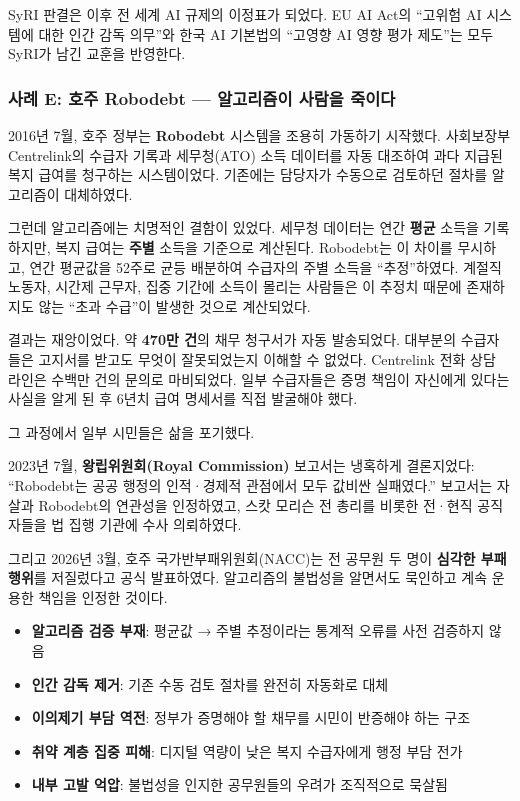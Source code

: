 SyRI 판결은 이후 전 세계 AI 규제의 이정표가 되었다. EU AI Act의 ``고위험 AI 시스템에 대한 인간 감독 의무''와 한국 AI 기본법의 ``고영향 AI 영향 평가 제도''는 모두 SyRI가 남긴 교훈을 반영한다.

\subsubsection*{사례 E: 호주 Robodebt --- 알고리즘이 사람을 죽이다}

2016년 7월, 호주 정부는 \textbf{Robodebt} 시스템을 조용히 가동하기 시작했다. 사회보장부 Centrelink의 수급자 기록과 세무청(ATO) 소득 데이터를 자동 대조하여 과다 지급된 복지 급여를 청구하는 시스템이었다. 기존에는 담당자가 수동으로 검토하던 절차를 알고리즘이 대체하였다.

그런데 알고리즘에는 치명적인 결함이 있었다. 세무청 데이터는 연간 \textbf{평균} 소득을 기록하지만, 복지 급여는 \textbf{주별} 소득을 기준으로 계산된다. Robodebt는 이 차이를 무시하고, 연간 평균값을 52주로 균등 배분하여 수급자의 주별 소득을 ``추정''하였다. 계절직 노동자, 시간제 근무자, 집중 기간에 소득이 몰리는 사람들은 이 추정치 때문에 존재하지도 않는 ``초과 수급''이 발생한 것으로 계산되었다.

결과는 재앙이었다. 약 \textbf{470만 건}의 채무 청구서가 자동 발송되었다. 대부분의 수급자들은 고지서를 받고도 무엇이 잘못되었는지 이해할 수 없었다. Centrelink 전화 상담 라인은 수백만 건의 문의로 마비되었다. 일부 수급자들은 증명 책임이 자신에게 있다는 사실을 알게 된 후 6년치 급여 명세서를 직접 발굴해야 했다.

그 과정에서 일부 시민들은 삶을 포기했다.

2023년 7월, \textbf{왕립위원회(Royal Commission)} 보고서는 냉혹하게 결론지었다: ``Robodebt는 공공 행정의 인적·경제적 관점에서 모두 값비싼 실패였다.'' 보고서는 자살과 Robodebt의 연관성을 인정하였고, 스캇 모리슨 전 총리를 비롯한 전·현직 공직자들을 법 집행 기관에 수사 의뢰하였다.\cite{south2024automated}

그리고 2026년 3월, 호주 국가반부패위원회(NACC)는 전 공무원 두 명이 \textbf{심각한 부패 행위}를 저질렀다고 공식 발표하였다. 알고리즘의 불법성을 알면서도 묵인하고 계속 운용한 책임을 인정한 것이다.

\begin{tcolorbox}[colback=red!5!white, colframe=red!60!black, title={\textbf{거버넌스 진단: Robodebt 실패의 핵심 원인}}]
\begin{itemize}
    \item \textbf{알고리즘 검증 부재}: 평균값 → 주별 추정이라는 통계적 오류를 사전 검증하지 않음
    \item \textbf{인간 감독 제거}: 기존 수동 검토 절차를 완전히 자동화로 대체
    \item \textbf{이의제기 부담 역전}: 정부가 증명해야 할 채무를 시민이 반증해야 하는 구조
    \item \textbf{취약 계층 집중 피해}: 디지털 역량이 낮은 복지 수급자에게 행정 부담 전가
    \item \textbf{내부 고발 억압}: 불법성을 인지한 공무원들의 우려가 조직적으로 묵살됨
\end{itemize}
\end{tcolorbox}

